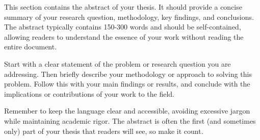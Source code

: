 
This section contains the abstract of your thesis. It should provide a concise summary of your research question, methodology, key findings, and conclusions. The abstract typically contains 150-300 words and should be self-contained, allowing readers to understand the essence of your work without reading the entire document.

Start with a clear statement of the problem or research question you are addressing. Then briefly describe your methodology or approach to solving this problem. Follow this with your main findings or results, and conclude with the implications or contributions of your work to the field.

Remember to keep the language clear and accessible, avoiding excessive jargon while maintaining academic rigor. The abstract is often the first (and sometimes only) part of your thesis that readers will see, so make it count.
